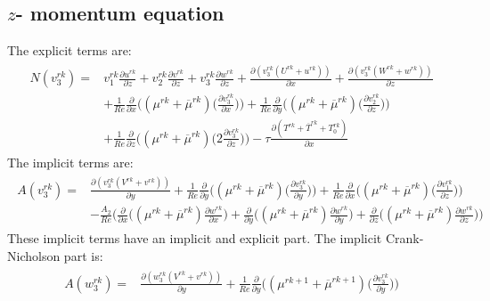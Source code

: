 \documentclass[preprint,12pt]{article}
\begin{document}
\subsection{$z$- momentum equation}
The explicit terms are:
\begin{align}\begin{split}
N(v_3^{rk})=&v_1^{rk}\frac{\partial u^{rk}}{\partial z}+v_2^{rk}\frac{\partial v^{rk}}{\partial z}+v_3^{rk}\frac{\partial w^{rk}}{\partial z}+\frac{\partial (v_3^{rk}(U^{rk}+u^{rk}))}{\partial x}+\frac{\partial (v_3^{rk}(W^{rk}+w^{rk}))}{\partial z}\\&+\frac{1}{Re}\frac{\partial}{\partial x}\Big(({\mu}^{rk}+\overline{\mu}^{rk})\Big(\frac{\partial v_3^{rk}}{\partial x}\Big)\Big)+\frac{1}{Re}\frac{\partial}{\partial y}\Big(({\mu}^{rk}+\overline{\mu}^{rk})\Big(\frac{\partial v_2^{rk}}{\partial z}\Big)\Big)\\&+\frac{1}{Re}\frac{\partial}{\partial z}\Big(({\mu}^{rk}+\overline{\mu}^{rk})\Big(2\frac{\partial v_3^{rk}}{\partial z}\Big)\Big)-\tau\frac{\partial (T^{rk}+\overline{T}^{rk}+T_0^{rk})}{\partial x}
\end{split} \end{align}	
The implicit terms are:
\begin{align}\begin{split}
A(v_3^{rk})=&\frac{\partial (v_3^{rk}(V^{rk}+v^{rk}))}{\partial y}+\frac{1}{Re}\frac{\partial}{\partial y}\Big(({\mu}^{rk}+\overline{\mu}^{rk})\Big(\frac{\partial v_3^{rk}}{\partial y}\Big)\Big)+\frac{1}{Re}\frac{\partial}{\partial x}\Big(({\mu}^{rk}+\overline{\mu}^{rk})\Big(\frac{\partial v_1^{rk}}{\partial z}\Big)\Big)\\&-\frac{A_2}{Re}\Bigg(\frac{\partial}{\partial x}\Big((\mu^{rk}+\overline{\mu}^{rk})\frac{\partial w^{rk}}{\partial x}\Big)+\frac{\partial}{\partial y}\Big((\mu^{rk}+\overline{\mu}^{rk})\frac{\partial w^{rk}}{\partial y}\Big)+\frac{\partial}{\partial z}\Big((\mu^{rk}+\overline{\mu}^{rk})\frac{\partial w^{rk}}{\partial z}\Big)\Bigg)
\end{split} \end{align}	
These implicit terms have an implicit and explicit part. The implicit Crank- Nicholson part is:
\begin{align}\begin{split}
A(w_3^{rk})=&\frac{\partial (w_3^{rk}(V^{rk}+v^{rk}))}{\partial y}+\frac{1}{Re}\frac{\partial}{\partial y}\Big(({\mu}^{rk+1}+\overline{\mu}^{rk+1})\Big(\frac{\partial v_3^{rk}}{\partial y}\Big)\Big)
\end{split} \end{align}	
\end{document}

